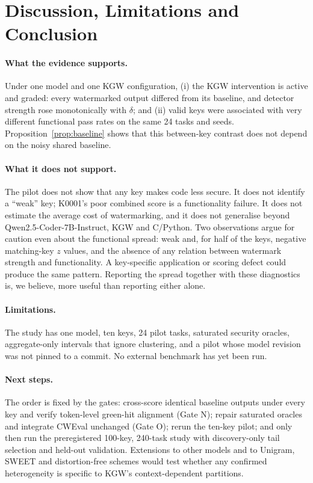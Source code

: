 \section{Discussion, Limitations and Conclusion}
\label{sec:conclusion}

\paragraph{What the evidence supports.} Under one model and one KGW configuration, (i) the KGW intervention is active and graded: every watermarked output differed from its baseline, and detector strength rose monotonically with $\delta$; and (ii) valid keys were associated with very different functional pass rates on the same 24 tasks and seeds. Proposition~\ref{prop:baseline} shows that this between-key contrast does not depend on the noisy shared baseline.

\paragraph{What it does not support.} The pilot does not show that any key makes code less secure. It does not identify a ``weak'' key; K0001's poor combined score is a functionality failure. It does not estimate the average cost of watermarking, and it does not generalise beyond Qwen2.5-Coder-7B-Instruct, KGW and C/Python. Two observations argue for caution even about the functional spread: weak and, for half of the keys, negative matching-key $z$ values, and the absence of any relation between watermark strength and functionality. A key-specific application or scoring defect could produce the same pattern. Reporting the spread together with these diagnostics is, we believe, more useful than reporting either alone.

\paragraph{Limitations.} The study has one model, ten keys, 24 pilot tasks, saturated security oracles, aggregate-only intervals that ignore clustering, and a pilot whose model revision was not pinned to a commit. No external benchmark has yet been run.

\paragraph{Next steps.} The order is fixed by the gates: cross-score identical baseline outputs under every key and verify token-level green-hit alignment (Gate N); repair saturated oracles and integrate CWEval unchanged (Gate O); rerun the ten-key pilot; and only then run the preregistered 100-key, 240-task study with discovery-only tail selection and held-out validation. Extensions to other models and to Unigram, SWEET and distortion-free schemes would test whether any confirmed heterogeneity is specific to KGW's context-dependent partitions.


